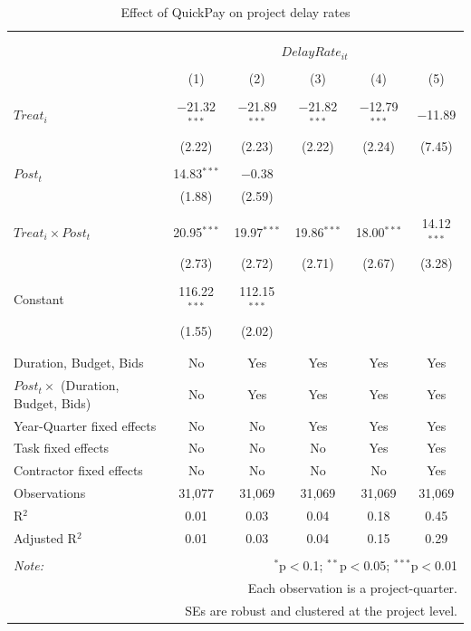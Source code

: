 \documentclass[
]{article}
\begin{document}
\begin{table}[H] \centering 
  \caption{Effect of QuickPay on project delay rates} 
  \label{} 
\small 
\begin{tabular}{@{\extracolsep{-2pt}}lccccc} 
\\[-1.8ex]\hline 
\hline \\[-1.8ex] 
\\[-1.8ex] & \multicolumn{5}{c}{$DelayRate_{it}$} \\ 
\\[-1.8ex] & (1) & (2) & (3) & (4) & (5)\\ 
\hline \\[-1.8ex] 
 $Treat_i$ & $-$21.32$^{***}$ & $-$21.89$^{***}$ & $-$21.82$^{***}$ & $-$12.79$^{***}$ & $-$11.89 \\ 
  & (2.22) & (2.23) & (2.22) & (2.24) & (7.45) \\ 
  & & & & & \\ 
 $Post_t$ & 14.83$^{***}$ & $-$0.38 &  &  &  \\ 
  & (1.88) & (2.59) &  &  &  \\ 
  & & & & & \\ 
 $Treat_i \times Post_t$ & 20.95$^{***}$ & 19.97$^{***}$ & 19.86$^{***}$ & 18.00$^{***}$ & 14.12$^{***}$ \\ 
  & (2.73) & (2.72) & (2.71) & (2.67) & (3.28) \\ 
  & & & & & \\ 
 Constant & 116.22$^{***}$ & 112.15$^{***}$ &  &  &  \\ 
  & (1.55) & (2.02) &  &  &  \\ 
  & & & & & \\ 
\hline \\[-1.8ex] 
Duration, Budget, Bids & No & Yes & Yes & Yes & Yes \\ 
$Post_t \times$  (Duration, Budget, Bids) & No & Yes & Yes & Yes & Yes \\ 
Year-Quarter fixed effects & No & No & Yes & Yes & Yes \\ 
Task fixed effects & No & No & No & Yes & Yes \\ 
Contractor fixed effects & No & No & No & No & Yes \\ 
Observations & 31,077 & 31,069 & 31,069 & 31,069 & 31,069 \\ 
R$^{2}$ & 0.01 & 0.03 & 0.04 & 0.18 & 0.45 \\ 
Adjusted R$^{2}$ & 0.01 & 0.03 & 0.04 & 0.15 & 0.29 \\ 
\hline 
\hline \\[-1.8ex] 
\textit{Note:}  & \multicolumn{5}{r}{$^{*}$p$<$0.1; $^{**}$p$<$0.05; $^{***}$p$<$0.01} \\ 
 & \multicolumn{5}{r}{Each observation is a project-quarter.} \\ 
 & \multicolumn{5}{r}{SEs are robust and clustered at the project level.} \\ 
\end{tabular} 
\end{table}
\end{document}
